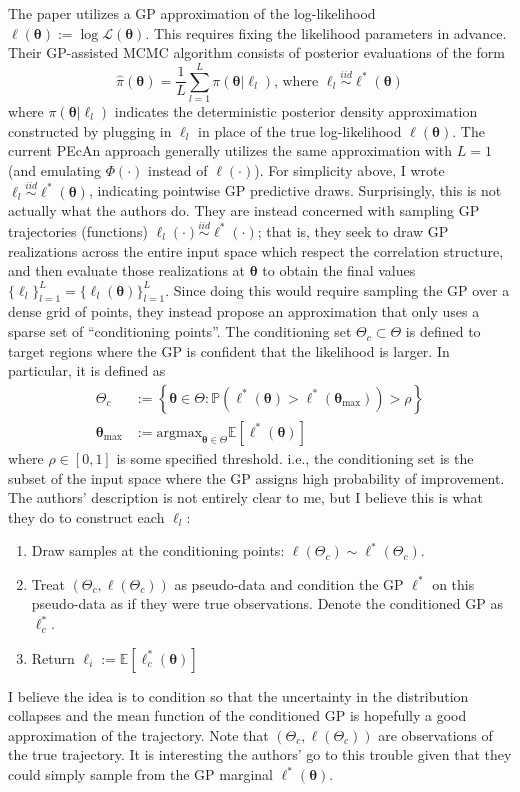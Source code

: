 \documentclass[12pt]{article}
\newcommand{\E}{\mathbb{E}}
\newcommand{\Prob}{\mathbb{P}}
\newcommand{\btheta}{\boldsymbol{\theta}}
\begin{document}
 The paper \cite{LEBEL2019158} utilizes a GP approximation of the log-likelihood 
 $\ell(\btheta) := \log \mathcal{L}(\btheta)$. This requires fixing the likelihood parameters in advance. Their GP-assisted MCMC algorithm consists of posterior evaluations of the form 
 \[\hat{\pi}(\btheta) = \frac{1}{L} \sum_{l = 1}^{L} \pi(\btheta|\ell_l) \text{, where } \ell_l \overset{iid}{\sim} \ell^*(\btheta)\]
 where $\pi(\btheta|\ell_l)$ indicates the deterministic posterior density approximation constructed by plugging in $\ell_l$ in place of the true log-likelihood $\ell(\btheta)$. 
 The current PEcAn approach generally utilizes the same approximation with $L = 1$ (and emulating $\Phi(\cdot)$ instead of $\ell(\cdot)$). For simplicity above, I wrote 
 $\ell_l \overset{iid}{\sim} \ell^*(\btheta)$, indicating pointwise GP predictive draws. Surprisingly, this is not actually what the authors do. They are 
 instead concerned with sampling GP trajectories (functions) $\ell_l(\cdot) \overset{iid}{\sim} \ell^*(\cdot)$; that is, they seek to draw GP realizations across the entire input space 
 which respect the correlation structure, and then evaluate those realizations at $\btheta$ to obtain the final values $\{\ell_l\}_{l = 1}^{L} = \{\ell_l(\btheta)\}_{l = 1}^{L}$. Since doing this 
 would require sampling the GP over a dense grid of points, they instead propose an approximation that only uses a sparse set of ``conditioning points''. The conditioning 
 set $\Theta_c \subset \Theta$ is defined to target regions where the GP is confident that the likelihood is larger. In particular, it is defined as 
 \begin{align*}
\Theta_c &:= \left\{\btheta \in \Theta : \Prob\left(\ell^*(\btheta) > \ell^*(\btheta_{\text{max}}) \right) > \rho \right\} \\
\btheta_{\text{max}} &:= \text{argmax}_{\btheta \in \Theta} \E\left[\ell^*(\btheta)\right]
 \end{align*}
 where $\rho \in [0, 1]$ is some specified threshold. i.e., the conditioning set is the subset of the input space where the GP assigns high probability of improvement. The authors' description is 
 not entirely clear to me, but I believe this is what they do to construct each $\ell_l$: 
 \begin{enumerate}
 \item Draw samples at the conditioning points: $\ell(\Theta_c) \sim \ell^*(\Theta_c)$. 
 \item Treat $\left(\Theta_c, \ell(\Theta_c)\right)$ as pseudo-data and condition the GP $\ell^*$ on this pseudo-data as if they were true observations. Denote the conditioned GP as $\ell^*_c$. 
 \item Return $\ell_i := \E\left[\ell_c^*(\btheta) \right]$
 \end{enumerate}
 I believe the idea is to condition so that the uncertainty in the distribution collapses and the mean function of the conditioned GP is hopefully a good approximation of the trajectory. Note that 
 $\left(\Theta_c, \ell(\Theta_c)\right)$ are observations of the true trajectory. It is interesting the authors' go to this trouble given that they could simply sample from the GP marginal 
 $\ell^*(\btheta)$. 
 
\end{document}
